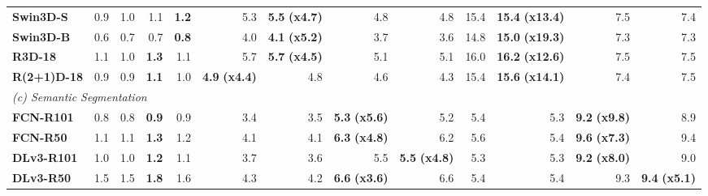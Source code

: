 \begin{table}[t]
{\begin{tabular}{lrrrrrrrrrrrr}
\midrule
\textbf{Swin3D-S} & 0.9 & 1.0 & 1.1 & \cellcolor{green!15}\textbf{1.2} & 5.3 & \cellcolor{green!15}\textbf{5.5} \textbf{(x4.7)} & 4.8 & 4.8 & 15.4 & \cellcolor{green!15}\textbf{15.4} \textbf{(x13.4)} & 7.5 & 7.4 \\
\textbf{Swin3D-B} & 0.6 & 0.7 & 0.7 & \cellcolor{green!15}\textbf{0.8} & 4.0 & \cellcolor{green!15}\textbf{4.1} \textbf{(x5.2)} & 3.7 & 3.6 & 14.8 & \cellcolor{green!15}\textbf{15.0} \textbf{(x19.3)} & 7.3 & 7.3 \\
\textbf{R3D-18} & 1.1 & 1.0 & \cellcolor{green!15}\textbf{1.3} & 1.1 & 5.7 & \cellcolor{green!15}\textbf{5.7} \textbf{(x4.5)} & 5.1 & 5.1 & 16.0 & \cellcolor{green!15}\textbf{16.2} \textbf{(x12.6)} & 7.5 & 7.5 \\
\textbf{R(2+1)D-18} & 0.9 & 0.9 & \cellcolor{green!15}\textbf{1.1} & 1.0 & \cellcolor{green!15}\textbf{4.9} \textbf{(x4.4)} & 4.8 & 4.6 & 4.3 & 15.4 & \cellcolor{green!15}\textbf{15.6} \textbf{(x14.1)} & 7.4 & 7.5 \\
\midrule
\multicolumn{13}{l}{\textit{(c) Semantic Segmentation}} \\
\midrule
\textbf{FCN-R101} & 0.8 & 0.8 & \cellcolor{green!15}\textbf{0.9} & 0.9 & 3.4 & 3.5 & \cellcolor{green!15}\textbf{5.3} \textbf{(x5.6)} & 5.2 & 5.4 & 5.3 & \cellcolor{green!15}\textbf{9.2} \textbf{(x9.8)} & 8.9 \\
\textbf{FCN-R50} & 1.1 & 1.1 & \cellcolor{green!15}\textbf{1.3} & 1.2 & 4.1 & 4.1 & \cellcolor{green!15}\textbf{6.3} \textbf{(x4.8)} & 6.2 & 5.6 & 5.4 & \cellcolor{green!15}\textbf{9.6} \textbf{(x7.3)} & 9.4 \\
\textbf{DLv3-R101} & 1.0 & 1.0 & \cellcolor{green!15}\textbf{1.2} & 1.1 & 3.7 & 3.6 & 5.5 & \cellcolor{green!15}\textbf{5.5} \textbf{(x4.8)} & 5.3 & 5.3 & \cellcolor{green!15}\textbf{9.2} \textbf{(x8.0)} & 9.0 \\
\textbf{DLv3-R50} & 1.5 & 1.5 & \cellcolor{green!15}\textbf{1.8} & 1.6 & 4.3 & 4.2 & \cellcolor{green!15}\textbf{6.6} \textbf{(x3.6)} & 6.6 & 5.4 & 5.4 & 9.3 & \cellcolor{green!15}\textbf{9.4} \textbf{(x5.1)} \\
\bottomrule
\end{tabular}%
}
\end{table}

